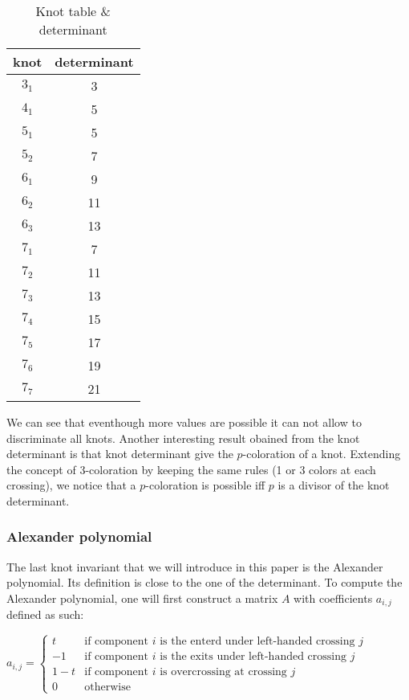 \documentclass[12pt, a4paper]{article}
\begin{document}
\begin{table}[H]
\begin{center}
  \begin{tabular}{| c | c |}
    \hline
    knot & determinant\\
    \hline
    $3_1$ & 3\\
    \hline
    $4_1$ & 5\\
    \hline
    $5_1$ & 5\\
    \hline
    $5_2$ & 7\\
    \hline
    $6_1$ & 9\\
    \hline
    $6_2$ & 11\\
    \hline
    $6_3$ & 13\\
    \hline
    $7_1$ & 7\\
    \hline
    $7_2$ & 11\\
    \hline
    $7_3$ & 13\\
    \hline
    $7_4$ & 15\\
    \hline
    $7_5$ & 17\\
    \hline
    $7_6$ & 19\\
    \hline
    $7_7$ & 21\\
    \hline
  \end{tabular}
\end{center}
  \caption{Knot table \& determinant}
\label{tab:knot_determinant}
\end{table}

We can see that eventhough more values are possible it can not allow to discriminate all knots. Another interesting result obained from the knot determinant is that knot determinant give the $p$-coloration of a knot. Extending the concept of $3$-coloration by keeping the same rules (1 or 3 colors at each crossing), we notice that a $p$-coloration is possible iff $p$ is a divisor of the knot determinant.

\subsubsection{Alexander polynomial}

The last knot invariant that we will introduce in this paper is the Alexander polynomial. Its definition is close to the one of the determinant. To compute the Alexander polynomial, one will first construct a matrix $A$ with coefficients $a_{i,j}$ defined as such: 

\begin{center}
  $a_{i,j} =
  \begin{cases}
    t &\text{if component $i$ is the enterd under left-handed crossing $j$}\\
    -1 &\text{if component $i$ is the exits under left-handed crossing $j$}\\
    1-t &\text{if component $i$ is overcrossing at crossing $j$}\\
    0 &\text{otherwise}
  \end{cases}$
\end{center}
\end{document}
